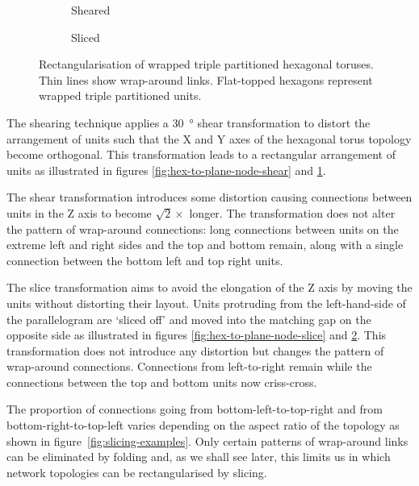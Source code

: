 \begin{figure}
\begin{subfigure}[b]{0.32\linewidth}
					\caption{Sheared}
					\label{fig:hex-to-plane-shear}
				\end{subfigure}
				\begin{subfigure}[b]{0.32\linewidth}
					\center
					
					\caption{Sliced}
					\label{fig:hex-to-plane-slice}
				\end{subfigure}
				
				\caption[Rectangularisation of wrapped triple partitioned toruses.]%
				{Rectangularisation of wrapped triple partitioned hexagonal
				toruses. Thin lines show wrap-around links.  Flat-topped hexagons
				represent wrapped triple partitioned units.}
				\label{fig:hex-to-plane}
			\end{figure}
			
			The shearing technique applies a \SI{30}{\degree} shear transformation to
			distort the arrangement of units such that the X and Y axes of the
			hexagonal torus topology become orthogonal. This transformation leads to
			a rectangular arrangement of units as illustrated in figures
			\ref{fig:hex-to-plane-node-shear} and \ref{fig:hex-to-plane-shear}.
			
			The shear transformation introduces some distortion causing connections
			between units in the Z axis to become $\sqrt{2} \times$ longer. The
			transformation does not alter the pattern of wrap-around connections:
			long connections between units on the extreme left and right sides and
			the top and bottom remain, along with a single connection between the
			bottom left and top right units.
			
			The slice transformation aims to avoid the elongation of the Z axis by
			moving the units without distorting their layout. Units protruding from
			the left-hand-side of the parallelogram are `sliced off' and moved into
			the matching gap on the opposite side as illustrated in figures
			\ref{fig:hex-to-plane-node-slice} and \ref{fig:hex-to-plane-slice}. This
			transformation does not introduce any distortion but changes the pattern
			of wrap-around connections.  Connections from left-to-right remain while
			the connections between the top and bottom units now criss-cross.
			
			The proportion of connections going from bottom-left-to-top-right and
			from bottom-right-to-top-left varies depending on the aspect ratio of the
			topology as shown in figure~\ref{fig:slicing-examples}. Only certain
			patterns of wrap-around links can be eliminated by folding and, as we
			shall see later, this limits us in which network topologies can be
			rectangularised by slicing.
			
